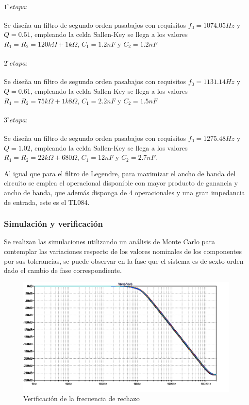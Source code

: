 \paragraph{$1^{\circ} etapa:$} Se dise\~na un filtro de segundo orden pasabajos con requisitos $f_0 = 1074.05Hz$ y $Q = 0.51$, empleando la celda Sallen-Key se llega a los valores $R_1 = R_2 = 120k \Omega + 1k\Omega$, $C_1 = 1.2nF$ y $C_2 = 1.2nF$
\paragraph{$2^{\circ} etapa:$} Se dise\~na un filtro de segundo orden pasabajos con requisitos $f_0 = 1131.14Hz$ y $Q = 0.61$, empleando la celda Sallen-Key se llega a los valores $R_1 = R_2 = 75k \Omega + 1k8\Omega$, $C_1 = 2.2nF$ y $C_2 = 1.5nF$
\paragraph{$3^{\circ} etapa:$} Se dise\~na un filtro de segundo orden pasabajos con requisitos $f_0 = 1275.48Hz$ y $Q = 1.02$, empleando la celda Sallen-Key se llega a los valores $R_1 = R_2 = 22k \Omega + 680\Omega$, $C_1 = 12nF$ y $C_2 = 2.7nF$.
 
Al igual que para el filtro de Legendre, para maximizar el ancho de banda del circuito se emplea el operacional disponible con mayor producto de ganancia y ancho de banda, que adem\'as disponga de 4 operacionales y una gran impedancia de entrada, este es el TL084.

\subsubsection{Simulaci\'on y verificaci\'on}
Se realizan las simulaciones utilizando un an\'alisis de Monte Carlo para contemplar las variaciones respecto de los valores nominales de los componentes por sus tolerancias,
se puede observar en la fase que el sistema es de sexto orden dado el cambio de fase correspondiente.

\begin{figure}[H]
    \centering
    \includegraphics[scale=0.6]{../EJ1/Recursos/bessel_verificacion_magnitud.png}
    \caption{Verificaci\'on de la frecuencia de rechazo}
\end{figure}

